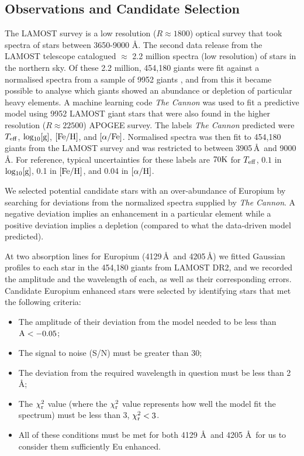\documentclass[a4paper,fleqn,usenatbib]{mnras}
\begin{document}
	\subsection{Observations and Candidate Selection}
	
	The LAMOST survey is a low resolution ($R\approx1800$) optical survey that took spectra of stars between 3650-9000 \AA. The second data release from the LAMOST telescope catalogued $\approx$ 2.2 million spectra (low resolution) of stars in the northern sky. Of these 2.2 million, 454,180 giants were fit against a normalised spectra from a sample of 9952 giants \citep{AnnaHo2017}, and from this it became possible to analyse which giants showed an abundance or depletion of particular heavy elements. A machine learning code \textit{The Cannon} was used to fit a predictive model using 9952 LAMOST giant stars that were also found in the higher resolution ($R\approx22500$) APOGEE survey. The labels \textit{The Cannon} predicted were $T_{\rm{eff}}$, $\rm{log_{10}[g]}$, $\rm{[Fe/H]}$, and $\rm{[\alpha/Fe]}$. Normalised spectra was then fit to 454,180 giants from the LAMOST survey and was restricted to between 3905\,\AA\ and 9000\,\AA. For reference, typical uncertainties for these labels are $70\rm{K}$ for $T_{\rm{eff}}$, $0.1$ in $\rm{log_{10}[g]}$, 0.1 in $\rm{[Fe/H]}$, and 0.04 in $\rm{[\alpha/H]}$.
	
	We selected potential candidate stars with an over-abundance of Europium by searching for deviations from the normalized spectra supplied by \textit{The Cannon}. A negative deviation implies an enhancement in a particular element while a positive deviation implies a depletion (compared to what the data-driven model predicted). 
	
	At two absorption lines for Europium (4129\,\AA\ and 4205\,\AA) we fitted Gaussian profiles to each star in the 454,180 giants from LAMOST DR2, and we recorded the amplitude and the wavelength of each, as well as their corresponding errors. Candidate Europium enhanced stars were selected by identifying stars that met the following criteria:
	
	\begin{itemize}
		\item The amplitude of their deviation from the model needed to be less than $\rm{A}<-0.05$;
		\item The signal to noise (S/N) must be greater than 30;
		\item The deviation from the required wavelength in question must be less than 2 \AA;
		\item The $\chi_{\rm{r}}^{2}$ value (where the $\chi_{\rm{r}}^{2}$ value represents how well the model fit the spectrum) must be less than 3, $\chi_{\rm{r}}^{2}<3$.
		\item All of these conditions must be met for both 4129 \AA\ and 4205 \AA\ for us to consider them sufficiently Eu enhanced.
	\end{itemize}   
	
\end{document}
